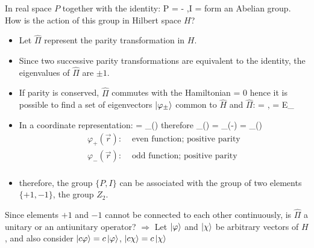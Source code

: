 \documentclass[12pt]{article}
\begin{document}
In real space $P$ together with the identity:
\be
P = - ,\quad I = 
\ee
form an Abelian group. How is the action of this
group in Hilbert space $H$?
\begin{itemize}
\item Let $\hat{\Pi}$ represent the parity transformation in $H$.
%
\item Since two successive parity transformations
are equivalent to the identity, the eigenvalues
of $\hat{\Pi}$ are $\pm1$.
%
\item If parity is conserved, $\hat{\Pi}$ commutes with
the Hamiltonian
 = 0
\ee
hence it is possible to find a set of eigenvectors
$\ket{\varphi_\pm}$ common to $\hat{H}$ and $\hat{\Pi}$:
\be
\hat{\Pi}\ket{\varphi_\pm} = \pm\ket{\varphi_\pm},\quad
{}\ket{\varphi_\pm} = E_\pm \ket{\varphi_\pm}
\ee
%
\item In a coordinate representation:
\be
{}\ket{\varphi_\pm} = \varphi_\pm()
\ee
therefore
\be
\hat{\Pi} \varphi_\pm() =  \varphi_\pm(-) = \pm \varphi_\pm()
\ee
\[
\begin{aligned}
\varphi_+(\vec{r}):& \text{ even function; positive parity}\\
\varphi_-(\vec{r}):& \text{ odd function; positive parity}\\
\end{aligned}
\]
\item therefore, the group $\{P,I\}$ can be associated
with the group of two elements $\{+1,-1\}$, the
group $Z_2$.
\end{itemize}

Since elements $+1$ and $-1$ cannot be connected
to each other continuously, is $\hat{\Pi}$ a unitary or
an antiunitary operator? $\Rightarrow$
Let $\ket{\varphi}$ and $\ket{\chi}$ be arbitrary vectors of $H$,
and also consider $\ket{c\varphi} = c\ket{\varphi}$, $\ket{c\chi} = c\ket{\chi}$

\end{document}
